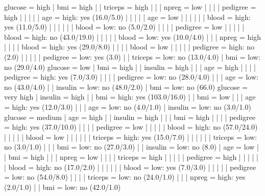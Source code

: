 glucose = high
|   bmi = high
|   |   triceps = high
|   |   |   npreg = low
|   |   |   |   pedigree = high
|   |   |   |   |   age = high: yes (16.0/5.0)
|   |   |   |   |   age = low
|   |   |   |   |   |   blood = high: yes (11.0/5.0)
|   |   |   |   |   |   blood = low: no (5.0/2.0)
|   |   |   |   pedigree = low
|   |   |   |   |   blood = high: no (43.0/19.0)
|   |   |   |   |   blood = low: yes (10.0/4.0)
|   |   |   npreg = high
|   |   |   |   blood = high: yes (29.0/8.0)
|   |   |   |   blood = low
|   |   |   |   |   pedigree = high: no (2.0)
|   |   |   |   |   pedigree = low: yes (3.0)
|   |   triceps = low: no (13.0/4.0)
|   bmi = low: no (29.0/4.0)
glucose = low
|   bmi = high
|   |   insulin = high
|   |   |   age = high
|   |   |   |   pedigree = high: yes (7.0/3.0)
|   |   |   |   pedigree = low: no (28.0/4.0)
|   |   |   age = low: no (43.0/4.0)
|   |   insulin = low: no (48.0/2.0)
|   bmi = low: no (66.0)
glucose = very high
|   insulin = high
|   |   bmi = high: yes (103.0/16.0)
|   |   bmi = low
|   |   |   age = high: yes (12.0/3.0)
|   |   |   age = low: no (4.0/1.0)
|   insulin = low: no (3.0/1.0)
glucose = medium
|   age = high
|   |   insulin = high
|   |   |   bmi = high
|   |   |   |   pedigree = high: yes (37.0/10.0)
|   |   |   |   pedigree = low
|   |   |   |   |   blood = high: no (57.0/24.0)
|   |   |   |   |   blood = low
|   |   |   |   |   |   triceps = high: yes (15.0/7.0)
|   |   |   |   |   |   triceps = low: no (3.0/1.0)
|   |   |   bmi = low: no (27.0/3.0)
|   |   insulin = low: no (8.0)
|   age = low
|   |   bmi = high
|   |   |   npreg = low
|   |   |   |   triceps = high
|   |   |   |   |   pedigree = high
|   |   |   |   |   |   blood = high: no (17.0/2.0)
|   |   |   |   |   |   blood = low: yes (7.0/3.0)
|   |   |   |   |   pedigree = low: no (54.0/8.0)
|   |   |   |   triceps = low: no (24.0/1.0)
|   |   |   npreg = high: yes (2.0/1.0)
|   |   bmi = low: no (42.0/1.0)

